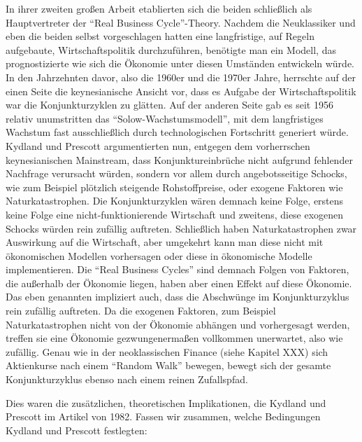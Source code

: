 In ihrer zweiten großen Arbeit \parencite{Kydland1982} etablierten sich die beiden schließlich als Hauptvertreter der "`Real Business Cycle"'-Theory. Nachdem die Neuklassiker und eben die beiden selbst \parencite{Kydland1977} vorgeschlagen hatten eine langfristige, auf Regeln aufgebaute, Wirtschaftspolitik durchzuführen, benötigte man ein Modell, das prognostizierte wie sich die Ökonomie unter diesen Umständen entwickeln würde. In den Jahrzehnten davor, also die 1960er und die 1970er Jahre, herrschte auf der einen Seite die keynesianische Ansicht vor, dass es Aufgabe der Wirtschaftspolitik war die Konjunkturzyklen zu glätten. Auf der anderen Seite gab es seit 1956 relativ unumstritten das "`Solow-Wachstumsmodell"', mit dem langfristiges Wachstum fast ausschließlich durch technologischen Fortschritt generiert würde.
Kydland und Prescott argumentierten nun, entgegen dem vorherrschen keynesianischen Mainstream, dass Konjunktureinbrüche nicht aufgrund fehlender Nachfrage verursacht würden, sondern vor allem durch angebotsseitige Schocks, wie zum Beispiel plötzlich steigende Rohstoffpreise, oder exogene Faktoren wie Naturkatastrophen. Die Konjunkturzyklen wären demnach keine Folge, erstens keine Folge eine nicht-funktionierende Wirtschaft und zweitens, diese exogenen Schocks würden rein zufällig auftreten. Schließlich haben Naturkatastrophen zwar Auswirkung auf die Wirtschaft, aber umgekehrt kann man diese nicht mit ökonomischen Modellen vorhersagen oder diese in ökonomische Modelle implementieren. Die "`Real Business Cycles"' sind demnach Folgen von Faktoren, die außerhalb der Ökonomie liegen, haben aber einen Effekt auf diese Ökonomie. Das eben genannten impliziert auch, dass die Abschwünge im Konjunkturzyklus rein zufällig auftreten. Da die exogenen Faktoren, zum Beispiel Naturkatastrophen nicht von der Ökonomie abhängen und vorhergesagt werden, treffen sie eine Ökonomie gezwungenermaßen vollkommen unerwartet, also wie zufällig. Genau wie in der neoklassischen Finance (siehe Kapitel XXX) sich Aktienkurse nach einem "`Random Walk"' bewegen, bewegt sich der gesamte Konjunkturzyklus ebenso nach einem reinen Zufallspfad.

Dies waren die zusätzlichen, theoretischen Implikationen, die Kydland und Prescott im Artikel von 1982. Fassen wir zusammen, welche Bedingungen Kydland und Prescott festlegten:

